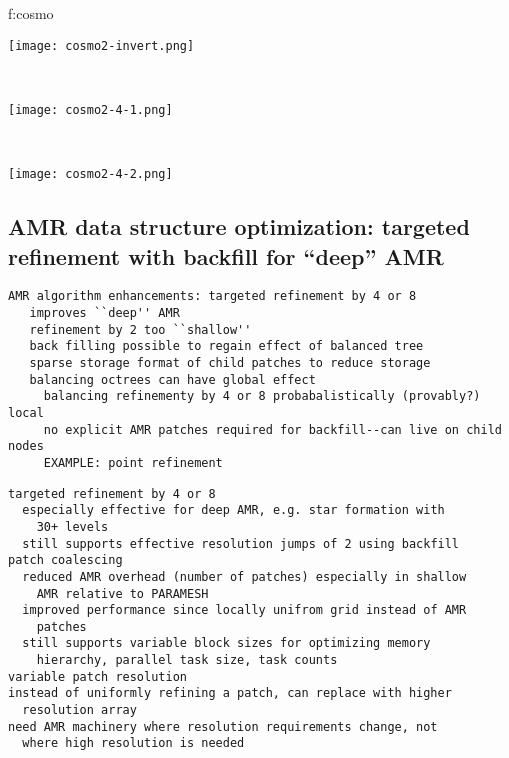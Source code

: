 \documentclass[14pt,letter]{article}
\begin{document}
{f:cosmo}{
\begin{minipage}{7.0in}
\begin{minipage}{2.2in}
\texttt{[image: cosmo2-invert.png]}
\end{minipage} \ 
\begin{minipage}{2.2in}
\texttt{[image: cosmo2-4-1.png]}
\end{minipage} \ 
\begin{minipage}{2.2in}
\texttt{[image: cosmo2-4-2.png]}
\end{minipage}
\end{minipage}
}


\subsection{AMR data structure optimization: targeted refinement with backfill for ``deep'' AMR}

\begin{verbatim}
AMR algorithm enhancements: targeted refinement by 4 or 8
   improves ``deep'' AMR
   refinement by 2 too ``shallow''
   back filling possible to regain effect of balanced tree
   sparse storage format of child patches to reduce storage 
   balancing octrees can have global effect
     balancing refinementy by 4 or 8 probabalistically (provably?) local
     no explicit AMR patches required for backfill--can live on child nodes 
     EXAMPLE: point refinement
\end{verbatim}

\begin{verbatim}
targeted refinement by 4 or 8
  especially effective for deep AMR, e.g. star formation with
    30+ levels
  still supports effective resolution jumps of 2 using backfill
patch coalescing
  reduced AMR overhead (number of patches) especially in shallow
    AMR relative to PARAMESH
  improved performance since locally unifrom grid instead of AMR
    patches
  still supports variable block sizes for optimizing memory
    hierarchy, parallel task size, task counts
variable patch resolution
instead of uniformly refining a patch, can replace with higher
  resolution array
need AMR machinery where resolution requirements change, not
  where high resolution is needed
\end{verbatim}
\end{document}
